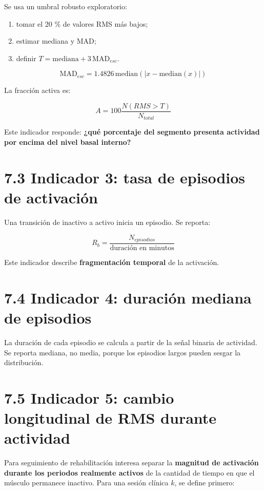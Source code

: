 \documentclass[
  spanish,
  a4paper,
  DIV=11,
  numbers=noendperiod]{scrreprt}
\providecommand{\tightlist}{%
  \setlength{\itemsep}{0pt}\setlength{\parskip}{0pt}}
\begin{document}
Se usa un umbral robusto exploratorio:

\begin{enumerate}
\def\labelenumi{\arabic{enumi}.}
\tightlist
\item
  tomar el 20 \% de valores RMS más bajos;
\item
  estimar mediana y MAD;
\item
  definir \(T=\mathrm{mediana}+3\,\mathrm{MAD}_{esc}\).
\end{enumerate}

\[
\mathrm{MAD}_{esc}=1.4826\,\mathrm{median}(|x-\mathrm{median}(x)|)
\]

La fracción activa es:

\[
A=100\frac{N(RMS>T)}{N_{total}}
\]

Este indicador responde: \textbf{¿qué porcentaje del segmento presenta
actividad por encima del nivel basal interno?}

\section{7.3 Indicador 3: tasa de episodios de
activación}\label{indicador-3-tasa-de-episodios-de-activaciuxf3n}

Una transición de inactivo a activo inicia un episodio. Se reporta:

\[
R_b=\frac{N_{episodios}}{\text{duración en minutos}}
\]

Este indicador describe \textbf{fragmentación temporal} de la
activación.

\section{7.4 Indicador 4: duración mediana de
episodios}\label{indicador-4-duraciuxf3n-mediana-de-episodios}

La duración de cada episodio se calcula a partir de la señal binaria de
actividad. Se reporta mediana, no media, porque los episodios largos
pueden sesgar la distribución.

\section{7.5 Indicador 5: cambio longitudinal de RMS durante
actividad}\label{indicador-5-cambio-longitudinal-de-rms-durante-actividad}

Para seguimiento de rehabilitación interesa separar la \textbf{magnitud
de activación durante los periodos realmente activos} de la cantidad de
tiempo en que el músculo permanece inactivo. Para una sesión clínica
\(k\), se define primero:
\end{document}
